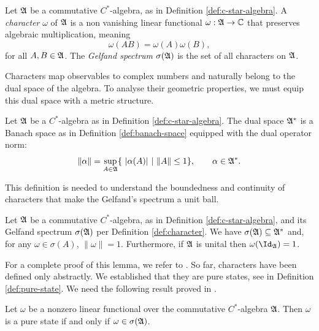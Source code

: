 	\begin{definition}\label{def:character}
		Let $\mathfrak{A}$ be a commutative $C^*$-algebra, as in Definition \ref{def:c-star-algebra}. A \emph{character} $\omega$ of $\mathfrak{A}$ is a non vanishing linear functional $\omega: \mathfrak{A} \to \mathbb{C}$ that preserves algebraic multiplication, meaning
		$$
		\omega(AB) = \omega(A)\omega(B),
		$$
		for all $A, B \in \mathfrak{A}$. The \emph{Gelfand spectrum} $\sigma(\mathfrak{A})$ is the set of all characters on $\mathfrak{A}$.
	\end{definition}
	
	Characters map observables to complex numbers and naturally belong to the dual space of the algebra. To analyse their geometric properties, we must equip this dual space with a metric structure.
	
	\begin{definition}\label{def:dual-norm}
		Let $\mathfrak{A}$ be a $C^*$-algebra as in Definition \ref{def:c-star-algebra}. The dual space $\mathfrak{A}^*$ is a Banach space as in Definition \ref{def:banach-space} equipped with the dual operator norm:
		$$
		\|\alpha\| = \sup_{A \in \mathfrak{A}} \{\  |\alpha(A)| \ | \ \|A\| \le 1 \}, \qquad \alpha \in \mathfrak{A}^*.
		$$
	\end{definition}
	
	\noindent This definition is needed to understand the boundedness and continuity of characters that make the Gelfand's spectrum a unit ball.
	
	\begin{lemma}\label{lemma:bound_char}
		Let $\mathfrak{A}$ be a commutative $C^*$-algebra, as in Definition \ref{def:c-star-algebra}, and its Gelfand spectrum $\sigma(\mathfrak{A})$ per Definition \ref{def:character}. We have $\sigma(\mathfrak{A}) \subseteq \mathfrak{A}^*$ and, for any $\omega \in \sigma(A)$, $\|\omega\| = 1$. Furthermore, if $\mathfrak{A}$ is unital then $\omega(\Id_\A) = 1$.
	\end{lemma}
	
	For a complete proof of this lemma, we refer to \cite[Lemma C.9]{landsmanFoundationsQuantumTheory2017}. So far, characters have been defined only abstractly. We established that they are pure states, see in Definition \ref{def:pure-state}. We need the following result proved in \cite[Proposition 2.3.27]{bratteliOperatorAlgebrasQuantum}.
	
	\begin{proposition}\label{prop:equivalence_states_characters}
		Let $\omega$ be a nonzero linear functional over the commutative $C^*$-algebra $\mathfrak{A}$. Then $\omega$ is a pure state if and only if $\omega \in \sigma(\mathfrak{A})$.
	\end{proposition}
	
